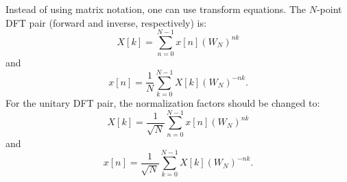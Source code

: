 

Instead of using matrix notation, one can use transform equations. 
The $N$-point DFT pair (forward and inverse, respectively) is:
\begin{equation}
        X[k] = \sum_{n=0}^{N-1} x[n] \left(W_N \right)^{nk}
        \label{eq:dft}
\end{equation}
and
\begin{equation}
        x[n] = \frac{1}{N} \sum_{k=0}^{N-1} X[k] \left(W_N \right)^{-nk}.
        \label{eq:idft}
\end{equation}
For the unitary DFT pair, the normalization factors should be changed to:
\begin{equation}
        X[k] = \frac{1}{\sqrt N} \sum_{n=0}^{N-1} x[n] \left(W_N \right)^{nk}
        \label{eq:unitary_dft}
\end{equation}
and
\begin{equation}
        x[n] = \frac{1}{\sqrt N} \sum_{k=0}^{N-1} X[k] \left(W_N \right)^{-nk}.
        \label{eq:unitary_idft}
\end{equation}


